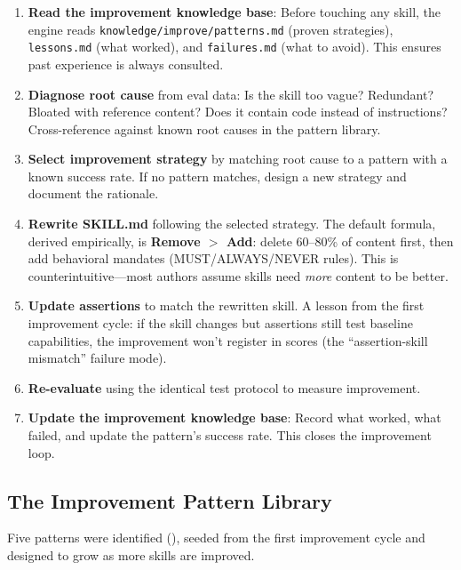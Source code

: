 \documentclass[11pt,a4paper]{article}
\begin{document}
\begin{enumerate}[leftmargin=*]
    \item \textbf{Read the improvement knowledge base}: Before touching any skill, the engine reads \texttt{knowledge/improve/patterns.md} (proven strategies), \texttt{lessons.md} (what worked), and \texttt{failures.md} (what to avoid). This ensures past experience is always consulted.
    \item \textbf{Diagnose root cause} from eval data: Is the skill too vague? Redundant? Bloated with reference content? Does it contain code instead of instructions? Cross-reference against known root causes in the pattern library.
    \item \textbf{Select improvement strategy} by matching root cause to a pattern with a known success rate. If no pattern matches, design a new strategy and document the rationale.
    \item \textbf{Rewrite SKILL.md} following the selected strategy. The default formula, derived empirically, is \textbf{Remove $>$ Add}: delete 60--80\% of content first, then add behavioral mandates (MUST/ALWAYS/NEVER rules). This is counterintuitive---most authors assume skills need \emph{more} content to be better.
    \item \textbf{Update assertions} to match the rewritten skill. A lesson from the first improvement cycle: if the skill changes but assertions still test baseline capabilities, the improvement won't register in scores (the ``assertion-skill mismatch'' failure mode).
    \item \textbf{Re-evaluate} using the identical test protocol to measure improvement.
    \item \textbf{Update the improvement knowledge base}: Record what worked, what failed, and update the pattern's success rate. This closes the improvement loop.
\end{enumerate}

\subsection{The Improvement Pattern Library}

Five patterns were identified (), seeded from the first improvement cycle and designed to grow as more skills are improved.
\end{document}
